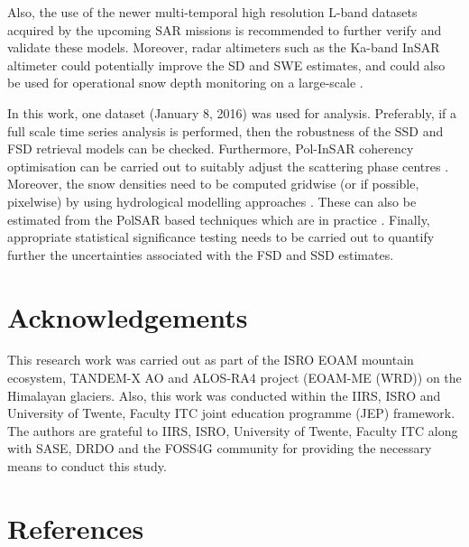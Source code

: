 \documentclass[review]{elsarticle}
\numberwithin{equation}{section}
\numberwithin{figure}{section}
\numberwithin{table}{section}
\begin{document}
Also, the use of the newer multi-temporal high resolution L-band datasets acquired by the upcoming SAR missions \citep{Tridon2018, Rosen2017} is recommended to further verify and validate these models. Moreover, radar altimeters such as the Ka-band InSAR altimeter could potentially improve the SD and SWE estimates, and could also be used for operational snow depth monitoring on a large-scale \citep{Hensley2016, Kim2018, Moller2011, Speziali2018}.

In this work, one dataset (January 8, 2016) was used for analysis. Preferably, if a full scale time series analysis is performed, then the robustness of the SSD and FSD retrieval models can be checked. Furthermore, Pol-InSAR coherency optimisation can be carried out to suitably adjust the scattering phase centres \citep{Cloude2005, Cloude2010}. Moreover, the snow densities need to be computed gridwise (or if possible, pixelwise) by using hydrological modelling approaches \citep{Bartelt2002, Liang1994}. These can also be estimated from the PolSAR based techniques which are in practice \citep{Singh2017, Thakur2012}. Finally, appropriate statistical significance testing needs to be carried out to quantify further the uncertainties associated with the FSD and SSD estimates.

\section*{Acknowledgements}
This research work was carried out as part of the ISRO EOAM mountain ecosystem, TANDEM-X AO and ALOS-RA4 project (EOAM-ME (WRD)) on the Himalayan glaciers. Also, this work was conducted within the IIRS, ISRO and University of Twente, Faculty ITC joint education programme (JEP) framework. The authors are grateful to IIRS, ISRO, University of Twente, Faculty ITC along with SASE, DRDO and the FOSS4G community for providing the necessary means to conduct this study.  
\section*{References}


\end{document}
